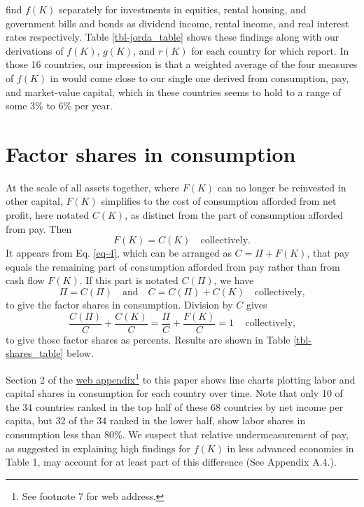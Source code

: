 \citeauthor{jorda2019} find \(f(K)\) separately for investments in equities, rental housing, and government bills and bonds as dividend income, rental income, and real interest rates respectively. Table \ref{tbl-jorda_table} shows these findings along with our derivations of \(f(K)\), \(g(K)\), and \(r(K)\) for each country for which \citeauthor{jorda2019} report. In those 16 countries, our impression is that a weighted average of the four measures of \(f(K)\) in \citeauthor{jorda2019} would come close to our single one derived from consumption, pay, and market-value capital, which in these countries seems to hold to a range of some 3\% to 6\% per year.




\section{Factor shares in consumption}

At the scale of all assets together, where $F(K)$ can no longer be reinvested in other capital, $F(K)$ simplifies to the cost of consumption afforded from net profit, here notated $C(K)$, as distinct from the part of consumption afforded from pay. Then 
%
\begin{equation}
F(K) = C(K) \quad \text{collectively.} \label{eq-7}
\end{equation}
%
It appears from Eq. \eqref{eq-4}, which can be arranged as $C = \Pi + F(K)$, that pay equals the remaining part of consumption afforded from pay rather than from cash flow $F(K)$. If this part is notated $C(\Pi)$, we have
\begin{equation}
\Pi = C(\Pi) \quad \text{and} \quad C = C(\Pi) + C(K) \quad \text{collectively,} \label{eq-8}
\end{equation}
to give the factor shares in consumption. Division by \(C\) gives
\begin{equation}
\frac{C(\Pi)}{C} + \frac{C(K)}{C} = \frac{\Pi}{C} + \frac{F(K)}{C} = 1 \, \quad \text{collectively,} \label{eq-9}
\end{equation}
to give those factor shares as percents. Results are shown in Table \ref{tbl-shares_table} below.

\FloatBarrier

\FloatBarrier

Section 2 of the \href{https://web-appendix.quarto.pub/separate-way-to-measure-rate-of-return/}{web appendix}\footnote{See footnote 7 for web address.} to this paper shows line charts plotting labor and capital shares in consumption for each country over time. Note that only 10 of the 34 countries ranked in the top half of these 68 countries by net income per capita, but 32 of the 34 ranked in the lower half, show labor shares in consumption less than 80\%. We suspect that relative undermeasurement of pay, as suggested in explaining high findings for \(f(K)\) in less advanced economies in Table 1, may account for at least part of this difference (See Appendix A.4.).


